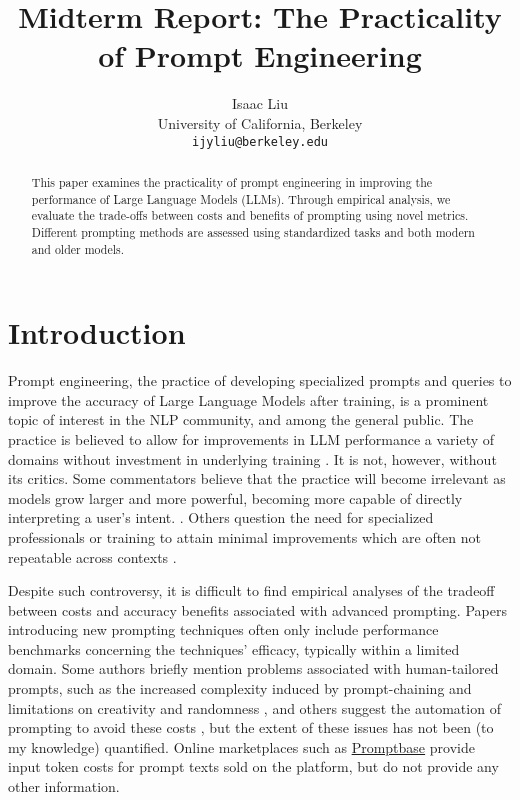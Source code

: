 \documentclass[11pt]{article}
\title{Midterm Report: The Practicality of Prompt Engineering}
\author{Isaac Liu \\
  University of California, Berkeley \\
  \texttt{ijyliu@berkeley.edu}}
\begin{document}
\maketitle
\begin{abstract}
  This paper examines the practicality of prompt engineering in improving the performance of Large Language Models (LLMs). Through empirical analysis, we evaluate the trade-offs between costs and benefits of prompting using novel metrics. Different prompting methods are assessed using standardized tasks and both modern and older models.
\end{abstract}

\section*{Introduction}

Prompt engineering, the practice of developing specialized prompts and queries to improve the accuracy of Large Language Models after training, is a prominent topic of interest in the NLP community, and among the general public. The practice is believed to allow for improvements in LLM performance a variety of domains without investment in underlying training \cite{martineau_what_2021}. It is not, however, without its critics. Some commentators believe that the practice will become irrelevant as models grow larger and more powerful, becoming more capable of directly interpreting a user's intent. \cite{ethan_mollick_emollick_i_2023}. Others question the need for specialized professionals or training to attain minimal improvements which are often not repeatable across contexts \cite{shackell_prompt_2023, acar_ai_2023}. 

Despite such controversy, it is difficult to find empirical analyses of the tradeoff between costs and accuracy benefits associated with advanced prompting. Papers introducing new prompting techniques often only include performance benchmarks concerning the techniques' efficacy, typically within a limited domain. Some authors briefly mention problems associated with human-tailored prompts, such as the increased complexity induced by prompt-chaining and limitations on creativity and randomness \cite{wu_ai_2022}, and others suggest the automation of prompting to avoid these costs \cite{diao_active_2023}, but the extent of these issues has not been (to my knowledge) quantified. Online marketplaces such as \href{https://promptbase.com/}{Promptbase} provide input token costs for prompt texts sold on the platform, but do not provide any other information.
\end{document}

